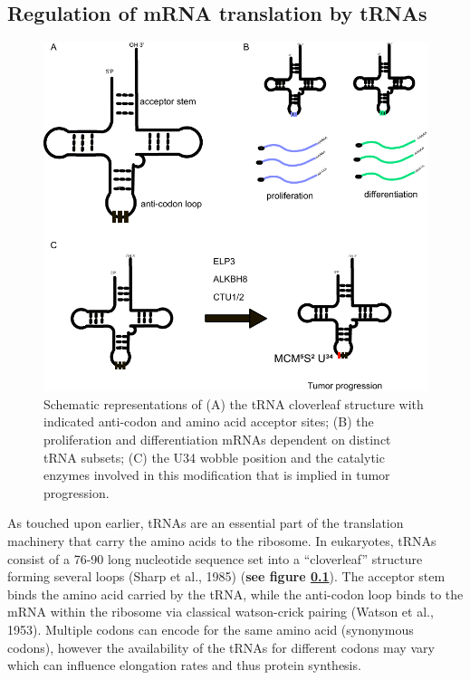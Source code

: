 \documentclass[12pt,openany]{book}
\begin{document}
\subsection{Regulation of mRNA translation by tRNAs} \label{tRNA}\begin{figure}
  \includegraphics{./figures/tRNA.pdf}
  \caption{ Schematic representations of (A) the tRNA cloverleaf structure with indicated anti-codon and amino acid acceptor sites;  (B)  the proliferation and differentiation mRNAs dependent on distinct tRNA subsets; (C) the U34 wobble position and the catalytic enzymes involved in this modification that is implied in tumor progression.
 \label{fig:tRNA}}
\end{figure}

As touched upon earlier, tRNAs are an essential part of the translation
machinery that carry the amino acids to the ribosome. In eukaryotes,
tRNAs consist of a 76-90 long nucleotide sequence set into a
``cloverleaf'' structure forming several loops (Sharp et al., 1985)
(\textbf{see figure \ref{tRNA}}). The acceptor stem binds the amino acid
carried by the tRNA, while the anti-codon loop binds to the mRNA within
the ribosome via classical watson-crick pairing (Watson et al., 1953).
Multiple codons can encode for the same amino acid (synonymous codons),
however the availability of the tRNAs for different codons may vary
which can influence elongation rates and thus protein synthesis.
\end{document}
